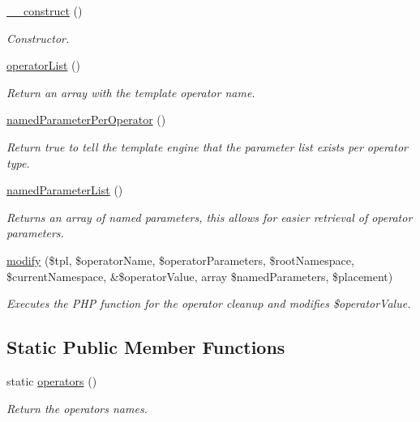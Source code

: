 \begin{DoxyCompactItemize}
\item 
\hyperlink{classextension_1_1ezsharenetwork_1_1autoloads_1_1e_z_share_network_template_operators_af10a79268eacc41474dccefaa71b2acf}{\-\_\-\-\_\-construct} ()
\begin{DoxyCompactList}\small\item\em Constructor. \end{DoxyCompactList}\item 
\hyperlink{classextension_1_1ezsharenetwork_1_1autoloads_1_1e_z_share_network_template_operators_aa1f32d984211ac2a3b943bf5dab3b6c9}{operator\-List} ()
\begin{DoxyCompactList}\small\item\em Return an array with the template operator name. \end{DoxyCompactList}\item 
\hyperlink{classextension_1_1ezsharenetwork_1_1autoloads_1_1e_z_share_network_template_operators_a290f7adfa03d65e7a92df410857fda56}{named\-Parameter\-Per\-Operator} ()
\begin{DoxyCompactList}\small\item\em Return true to tell the template engine that the parameter list exists per operator type. \end{DoxyCompactList}\item 
\hyperlink{classextension_1_1ezsharenetwork_1_1autoloads_1_1e_z_share_network_template_operators_a590677e63ab2ea0afef4f3f2452ad42f}{named\-Parameter\-List} ()
\begin{DoxyCompactList}\small\item\em Returns an array of named parameters, this allows for easier retrieval of operator parameters. \end{DoxyCompactList}\item 
\hyperlink{classextension_1_1ezsharenetwork_1_1autoloads_1_1e_z_share_network_template_operators_a574f0ba29da2d3cd3eab78ee3e77c16c}{modify} (\$tpl, \$operator\-Name, \$operator\-Parameters, \$root\-Namespace, \$current\-Namespace, \&\$operator\-Value, array \$named\-Parameters, \$placement)
\begin{DoxyCompactList}\small\item\em Executes the P\-H\-P function for the operator cleanup and modifies {\itshape \$operator\-Value\/}. \end{DoxyCompactList}\end{DoxyCompactItemize}
\subsection*{Static Public Member Functions}
\begin{DoxyCompactItemize}
\item 
static \hyperlink{classextension_1_1ezsharenetwork_1_1autoloads_1_1e_z_share_network_template_operators_a4c1659cadf4d079edada4e8f15c7437e}{operators} ()
\begin{DoxyCompactList}\small\item\em Return the operators names. \end{DoxyCompactList}\end{DoxyCompactItemize}
